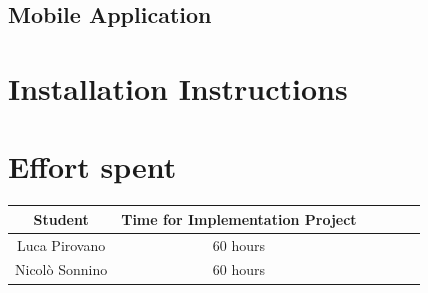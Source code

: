\documentclass[table, 12pt]{article}
\begin{document}
\subsection{Mobile Application}

\newpage
\section{Installation Instructions}

\section{Effort spent}
\begin{center}
    \begin{tabular}{ | c || c | c | c | c| c|}
        \hline
        Student        & Time for Implementation Project \\ \hline
        Luca Pirovano  & 60 hours                        \\ \hline
        Nicolò Sonnino & 60 hours                              \\
        \hline
    \end{tabular}
\end{center}
\end{document}
